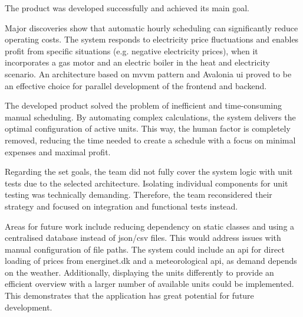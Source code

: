 
The product was developed successfully and achieved its main goal.

Major discoveries show that automatic hourly scheduling can significantly reduce operating costs. The system responds to electricity price fluctuations and enables profit from specific situations (e.g. negative electricity prices), when it incorporates a gas motor and an electric boiler in the heat and electricity scenario. An architecture based on \acrshort{mvvm} pattern and Avalonia \acrshort{ui} proved to be an effective choice for parallel development of the frontend and backend.

The developed product solved the problem of inefficient and time-consuming manual scheduling. By automating complex calculations, the system delivers the optimal configuration of active units. This way, the human factor is completely removed, reducing the time needed to create a schedule with a focus on minimal expenses and maximal profit.

Regarding the set goals, the team did not fully cover the system logic with unit tests due to the selected architecture. Isolating individual components for unit testing was technically demanding. Therefore, the team reconsidered their strategy and focused on integration and functional tests instead.

Areas for future work include reducing dependency on static classes and using a centralised database instead of \acrshort{json}/\acrshort{csv} files. This would address issues with manual configuration of file paths. The system could include an \acrshort{api} for direct loading of prices from energinet.dk and a meteorological \acrshort{api}, as demand depends on the weather. Additionally, displaying the units differently to provide an efficient overview with a larger number of available units could be implemented. This demonstrates that the application has great potential for future development.